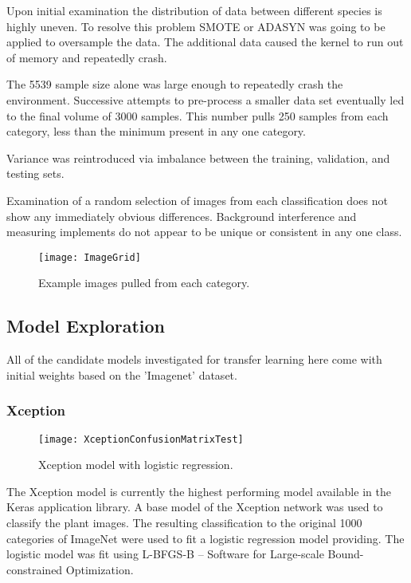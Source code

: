 \documentclass[]{article}
\begin{document}
Upon initial examination the distribution of data between different species is highly uneven.
To resolve this problem SMOTE\cite{Bowyer2011} or ADASYN\cite{Bai2008}  was going to be applied to oversample the data.
The additional data caused the kernel to run out of memory and repeatedly crash.

The 5539 sample size alone was large enough to repeatedly crash the environment.
Successive attempts to pre-process a smaller data set eventually led to the final volume of 3000 samples. 
This number pulls 250 samples from each category, less than the minimum present in any one category. 

Variance was reintroduced via imbalance between the training, validation, and testing sets.

Examination of a random selection of images from each classification does not show any immediately obvious differences. Background interference and measuring implements do not appear to be unique or consistent in any one class.
\begin{figure}[H]
	\texttt{[image: ImageGrid]}
	\caption{Example images pulled from each category.}
\end{figure}

\clearpage

\subsection{Model Exploration}

All of the candidate models investigated for transfer learning here come with initial weights based on the 'Imagenet' dataset.

\subsubsection{Xception}

\begin{wrapfigure}{r}{0.5\textwidth}
	\vspace{-6em}
	\begin{center}
		\texttt{[image: XceptionConfusionMatrixTest]}
	\end{center}
	\caption{Xception model with logistic regression.}	
\end{wrapfigure}

The Xception model is currently the highest performing model available in the Keras application library\cite{Chollet2016}.
A base model of the Xception network was used to classify the plant images. 
The resulting classification to the original 1000 categories of ImageNet were used to fit a logistic regression model providing.
The logistic model was fit using L-BFGS-B – Software for Large-scale Bound-constrained Optimization\cite{Zhu1997}.
\end{document}
